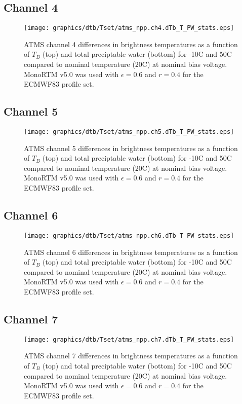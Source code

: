 \subsection{Channel 4}
\begin{figure}[H]
  \label{fig:Tset.ch4_dtb}
  \centering
  \hspace{1.5cm}\texttt{[image: graphics/dtb/Tset/atms\_npp.ch4.dTb\_T\_PW\_stats.eps]}
  \caption{ATMS channel 4 differences in brightness temperatures as a function of $T_B$ (top) and total preciptable water (bottom) for -10\textdegree{}C and 50\textdegree{}C compared to nominal temperature (20\textdegree{}C) at nominal bias voltage. MonoRTM v5.0 was used with $\epsilon=0.6$ and $r=0.4$ for the ECMWF83 profile set.}
\end{figure}

\subsection{Channel 5}
\begin{figure}[H]
  \label{fig:Tset.ch5_dtb}
  \centering
  \hspace{1.5cm}\texttt{[image: graphics/dtb/Tset/atms\_npp.ch5.dTb\_T\_PW\_stats.eps]}
  \caption{ATMS channel 5 differences in brightness temperatures as a function of $T_B$ (top) and total preciptable water (bottom) for -10\textdegree{}C and 50\textdegree{}C compared to nominal temperature (20\textdegree{}C) at nominal bias voltage. MonoRTM v5.0 was used with $\epsilon=0.6$ and $r=0.4$ for the ECMWF83 profile set.}
\end{figure}

\subsection{Channel 6}
\begin{figure}[H]
  \label{fig:Tset.ch6_dtb}
  \centering
  \hspace{1.5cm}\texttt{[image: graphics/dtb/Tset/atms\_npp.ch6.dTb\_T\_PW\_stats.eps]}
  \caption{ATMS channel 6 differences in brightness temperatures as a function of $T_B$ (top) and total preciptable water (bottom) for -10\textdegree{}C and 50\textdegree{}C compared to nominal temperature (20\textdegree{}C) at nominal bias voltage. MonoRTM v5.0 was used with $\epsilon=0.6$ and $r=0.4$ for the ECMWF83 profile set.}
\end{figure}

\subsection{Channel 7}
\begin{figure}[H]
  \label{fig:Tset.ch7_dtb}
  \centering
  \hspace{1.5cm}\texttt{[image: graphics/dtb/Tset/atms\_npp.ch7.dTb\_T\_PW\_stats.eps]}
  \caption{ATMS channel 7 differences in brightness temperatures as a function of $T_B$ (top) and total preciptable water (bottom) for -10\textdegree{}C and 50\textdegree{}C compared to nominal temperature (20\textdegree{}C) at nominal bias voltage. MonoRTM v5.0 was used with $\epsilon=0.6$ and $r=0.4$ for the ECMWF83 profile set.}
\end{figure}

